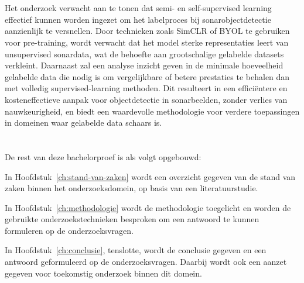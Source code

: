 \section{}%
\label{sec:onderzoeksdoelstelling}

Het onderzoek verwacht aan te tonen dat semi- en self-supervised learning effectief kunnen worden ingezet om het labelproces bij sonarobjectdetectie aanzienlijk te versnellen. Door technieken zoals SimCLR of BYOL te gebruiken voor pre-training, wordt verwacht dat het model sterke representaties leert van unsupervised sonardata, wat de behoefte aan grootschalige gelabelde datasets verkleint. Daarnaast zal een analyse inzicht geven in de minimale hoeveelheid gelabelde data die nodig is om vergelijkbare of betere prestaties te behalen dan met volledig supervised-learning methoden. Dit resulteert in een efficiëntere en kosteneffectieve aanpak voor objectdetectie in sonarbeelden, zonder verlies van nauwkeurigheid, en biedt een waardevolle methodologie voor verdere toepassingen in domeinen waar gelabelde data schaars is.

\section{}%
\label{sec:opzet-bachelorproef}


De rest van deze bachelorproef is als volgt opgebouwd:

In Hoofdstuk~\ref{ch:stand-van-zaken} wordt een overzicht gegeven van de stand van zaken binnen het onderzoeksdomein, op basis van een literatuurstudie.

In Hoofdstuk~\ref{ch:methodologie} wordt de methodologie toegelicht en worden de gebruikte onderzoekstechnieken besproken om een antwoord te kunnen formuleren op de onderzoeksvragen.


In Hoofdstuk~\ref{ch:conclusie}, tenslotte, wordt de conclusie gegeven en een antwoord geformuleerd op de onderzoeksvragen. Daarbij wordt ook een aanzet gegeven voor toekomstig onderzoek binnen dit domein.